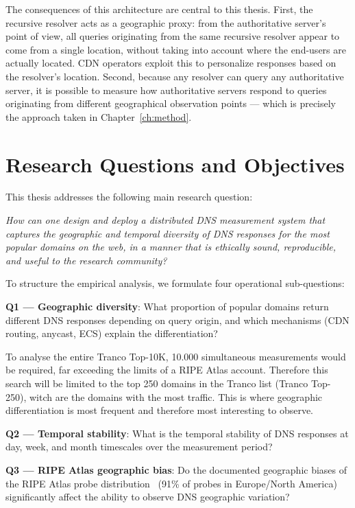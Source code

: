 The consequences of this architecture are central to this thesis. First, the recursive resolver acts as a geographic proxy: from the authoritative server's point of view, all queries originating from the same recursive resolver appear to come from a single location, without taking into account where the end-users are actually located. \ac{CDN} operators exploit this to personalize responses based on the resolver's location. Second, because any resolver can query any authoritative server, it is possible to measure how authoritative servers respond to queries originating from different geographical observation points — which is precisely the approach taken in Chapter~\ref{ch:method}.

\bigskip
\section{Research Questions and Objectives}
\label{sec:1.3}

This thesis addresses the following main research question:

\textit{How can one design and deploy a distributed \ac{DNS} measurement system that captures the geographic and temporal diversity of \ac{DNS} responses for the most popular domains on the web, in a manner that is ethically sound, reproducible, and useful to the research community?}

To structure the empirical analysis, we formulate four operational sub-questions:

\textbf{Q1 — Geographic diversity}: What proportion of popular domains return different \ac{DNS} responses depending on query origin, and which mechanisms (\ac{CDN} routing, anycast, \ac{ECS}) explain the differentiation? 

To analyse the entire Tranco Top-10K, 10.000 simultaneous measurements would be required, far exceeding the limits of a RIPE Atlas account. Therefore this search will be limited to the top 250 domains in the Tranco list (Tranco Top-250), witch are the domains with the most traffic. This is where geographic differentiation is most frequent and therefore most interesting to observe.

\textbf{Q2 — Temporal stability}: What is the temporal stability of \ac{DNS} responses at day, week, and month timescales over the measurement period?

\textbf{Q3 — RIPE Atlas geographic bias}: Do the documented geographic biases of the RIPE Atlas probe distribution~\cite{Bajpai2017} (91\% of probes in Europe/North America) significantly affect the ability to observe \ac{DNS} geographic variation?

